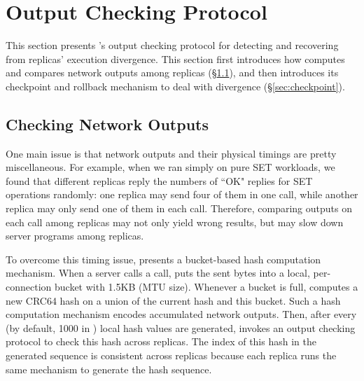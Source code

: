 \section{Output Checking Protocol} \label{sec:output}

This section presents \xxx's output checking protocol for detecting and 
recovering from replicas' execution divergence. This section first introduces 
how \xxx computes and compares network outputs among replicas 
(\S\ref{sec:output-workflow}), and then introduces its checkpoint and rollback 
mechanism to deal with divergence (\S\ref{sec:checkpoint}).

\subsection{Checking Network Outputs} \label{sec:output-workflow}

One main issue is that network outputs and their physical timings are pretty 
miscellaneous. For example, when we ran \redis simply on pure SET workloads, we 
found that different replicas reply the numbers of ``OK" replies for SET 
operations randomly: one replica may send four of them in one \send call, while 
another replica may only send one of them in each \send call. Therefore, 
comparing outputs on each \send call among replicas may not only yield wrong 
results, but may slow down server programs among replicas.

To overcome this timing issue, \xxx presents a bucket-based hash computation 
mechanism. When a server calls a \send call, \xxx puts the sent bytes into a 
local, per-connection bucket with 1.5KB (MTU size). Whenever a bucket 
is full, \xxx computes a new CRC64 hash on a union of the current hash and this 
bucket. Such a hash computation mechanism encodes accumulated network outputs. 
Then, after every \thashcomp (by default, 1000 in \xxx) local hash values are 
generated, \xxx invokes an output checking protocol to check this hash across 
replicas. The index of this hash in the generated sequence is consistent across 
replicas because each replica runs the same mechanism to generate the hash 
sequence.


